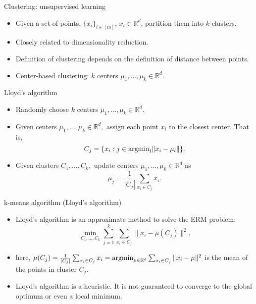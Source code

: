 \documentclass[final]{beamer}
\begin{document}
\begin{frame}{Clustering: unsupervised learning}
\begin{itemize}
	\item Given a set of points, $\{x_i\}_{i\in [m]}$, $x_i \in \mathbb{R}^d$, partition them into $k$ clusters.
	\pause
	\item Closely related to dimensionality reduction. 
	\pause
	\item Definition of clustering depends on the definition of distance between points. 
	\pause
	\item Center-based clustering: $k$ centers $\mu_1, \ldots, \mu_k \in \mathbb{R}^d.$

\end{itemize}
\end{frame}
\begin{frame}{Lloyd's algorithm}
	\begin{itemize}
		\item Randomly choose $k$ centers $\mu_1, \ldots, \mu_k \in \mathbb{R}^d.$
		\pause
	\item Given centers $\mu_1, \ldots, \mu_k \in \mathbb{R}^d,$ assign each point $x_i$ to the closest center. That is, $$C_j = \{x_i: j \in {\rm arg min}_l \|x_i - \mu_{l}\|\}.$$
		\pause
	\item Given clusters $C_1, \ldots, C_k,$ update centers $\mu_1, \ldots, \mu_k \in \mathbb{R}^d$ as $$\mu_j = \frac{1}{|C_j|} \sum_{x_i \in C_j} x_i.$$
		
	\end{itemize}
\end{frame}
\begin{frame}{k-means algorithm (Lloyd's algorithm)}
	\begin{itemize}
		\item Lloyd's algorithm is an approximate method to solve the ERM problem: $$\min_{C_1, \ldots, C_k} \sum_{j=1}^k \sum_{x_i \in C_j} \|x_i - \mu(C_j)\|^2.$$
		\pause
		\item here, $\mu(C_j) = \frac{1}{|C_j|} \sum_{x_i \in C_j} x_i = {\rm argmin}_{\mu \in \mathbb{R}^d} \sum_{x_i \in C_j} \|x_i - \mu\|^2$ is the mean of the points in cluster $C_j.$
		\pause
		\item Lloyd's algorithm is a heuristic. It is not guaranteed to converge to the global optimum or even a local minimum.
	\end{itemize}
\end{frame}
\end{document}
